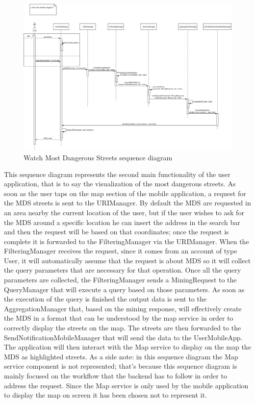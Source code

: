 \begin{figure}[H]
  \centering
  \includegraphics[width=1\textwidth]{Images/UML_diagrams/Sequence_Diagrams/Request_MDS_sd.png}
  \caption{Watch Most Dangerous Streets sequence diagram}
  \label{fig:watch_MDS_sd}
\end{figure}
This sequence diagram represents the second main functionality of the user application, that is to say the visualization of the most dangerous streets. As soon as the user taps on the map section of the mobile application, a request for the MDS streets is sent to the URIManager. By default the MDS are requested in an area nearby the current location of the user, but if the user wishes to ask for the MDS around a specific location he can insert the address in the search bar and then the request will be based on that coordinates; once the request is complete it is forwarded to the FilteringManager via the URIManager. When the FilteringManager receives the request, since it comes from an account of type User, it will automatically assume that the request is about MDS so it will collect the query parameters that are necessary for that operation.  Once all the query parameters are collected, the FilteringManager sends a MiningRequest to the QueryManager that will execute a query based on those parameters. As soon as the execution of the query is finished the output data is sent to the AggregationManager that, based on the mining response, will effectively create the MDS in a format that can be understood by the map service in order to correctly display the streets on the map. The streets are then forwarded to the SendNotificationMobileManager that will send the data to the UserMobileApp. The application will then interact with the Map service to display on the map the MDS as highlighted streets. As a side note: in this sequence diagram the Map service component is not represented; that's because this sequence diagram is mainly focused on the workflow that the backend has to follow in order to address the request. Since the Map service is only used by the mobile application to display the map on screen it has been chosen not to represent it.
